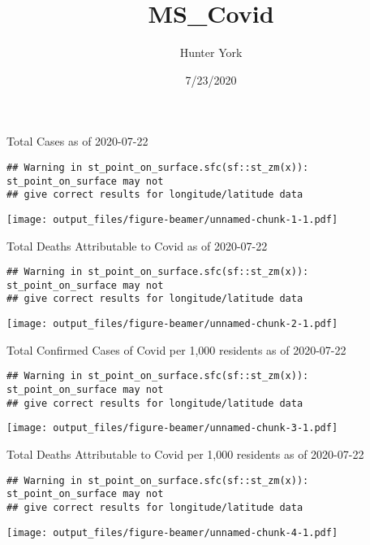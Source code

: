 \documentclass[
  ignorenonframetext,
]{beamer}
\title{MS\_Covid}
\author{Hunter York}
\date{7/23/2020}
\begin{document}
\frame{\titlepage}

\begin{frame}[fragile]{Total Cases as of 2020-07-22}
\protect\hypertarget{total-cases-as-of-2020-07-22}{}

\begin{verbatim}
## Warning in st_point_on_surface.sfc(sf::st_zm(x)): st_point_on_surface may not
## give correct results for longitude/latitude data
\end{verbatim}

\texttt{[image: output\_files/figure-beamer/unnamed-chunk-1-1.pdf]}

\end{frame}

\begin{frame}[fragile]{Total Deaths Attributable to Covid as of
2020-07-22}
\protect\hypertarget{total-deaths-attributable-to-covid-as-of-2020-07-22}{}

\begin{verbatim}
## Warning in st_point_on_surface.sfc(sf::st_zm(x)): st_point_on_surface may not
## give correct results for longitude/latitude data
\end{verbatim}

\texttt{[image: output\_files/figure-beamer/unnamed-chunk-2-1.pdf]}

\end{frame}

\begin{frame}[fragile]{Total Confirmed Cases of Covid per 1,000
residents as of 2020-07-22}
\protect\hypertarget{total-confirmed-cases-of-covid-per-1000-residents-as-of-2020-07-22}{}

\begin{verbatim}
## Warning in st_point_on_surface.sfc(sf::st_zm(x)): st_point_on_surface may not
## give correct results for longitude/latitude data
\end{verbatim}

\texttt{[image: output\_files/figure-beamer/unnamed-chunk-3-1.pdf]}

\end{frame}

\begin{frame}[fragile]{Total Deaths Attributable to Covid per 1,000
residents as of 2020-07-22}
\protect\hypertarget{total-deaths-attributable-to-covid-per-1000-residents-as-of-2020-07-22}{}

\begin{verbatim}
## Warning in st_point_on_surface.sfc(sf::st_zm(x)): st_point_on_surface may not
## give correct results for longitude/latitude data
\end{verbatim}

\texttt{[image: output\_files/figure-beamer/unnamed-chunk-4-1.pdf]}

\end{frame}
\end{document}
